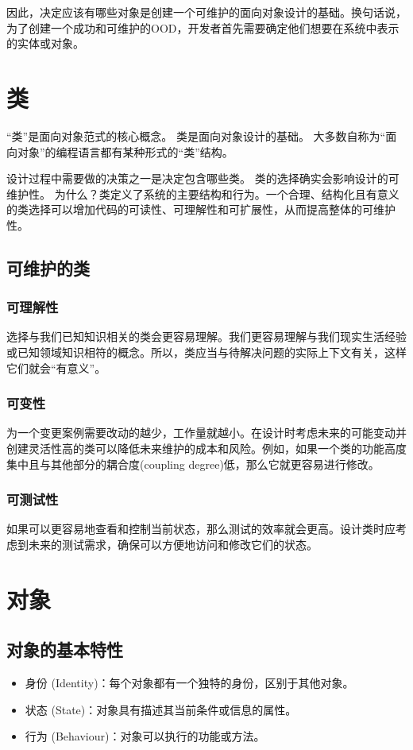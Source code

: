 因此，决定应该有哪些对象是创建一个可维护的面向对象设计的基础。换句话说，为了创建一个成功和可维护的OOD，开发者首先需要确定他们想要在系统中表示的实体或对象。

\section{类}
“类”是面向对象范式的核心概念。
类是面向对象设计的基础。
大多数自称为“面向对象”的编程语言都有某种形式的“类”结构。

设计过程中需要做的决策之一是决定包含哪些类。
类的选择确实会影响设计的可维护性。
为什么？类定义了系统的主要结构和行为。一个合理、结构化且有意义的类选择可以增加代码的可读性、可理解性和可扩展性，从而提高整体的可维护性。

\subsection{可维护的类}
\subsubsection{可理解性}
选择与我们已知知识相关的类会更容易理解。我们更容易理解与我们现实生活经验或已知领域知识相符的概念。所以，类应当与待解决问题的实际上下文有关，这样它们就会“有意义”。
\subsubsection{可变性}
为一个变更案例需要改动的越少，工作量就越小。在设计时考虑未来的可能变动并创建灵活性高的类可以降低未来维护的成本和风险。例如，如果一个类的功能高度集中且与其他部分的耦合度(coupling degree)低，那么它就更容易进行修改。
\subsubsection{可测试性}
如果可以更容易地查看和控制当前状态，那么测试的效率就会更高。设计类时应考虑到未来的测试需求，确保可以方便地访问和修改它们的状态。

\section{对象}
\subsection{对象的基本特性}
\begin{itemize}
    \item 身份 (Identity)：每个对象都有一个独特的身份，区别于其他对象。
    \item 状态 (State)：对象具有描述其当前条件或信息的属性。
    \item 行为 (Behaviour)：对象可以执行的功能或方法。
\end{itemize}

